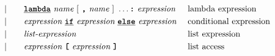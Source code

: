 \begin{alignat*}{9}
&&                       && |   &\quad &&   \textbf{\texttt{\underline{lambda}}} \ 
                                            \textit{name} \ 
                                                   [\ \textbf{\texttt{,}} \ \textit{name}\ ]\ \ldots
                                            \texttt{\textbf{:}}\ \textit{expression}
                                                           && \textrm{lambda expression}\\
&&                       && |   &\quad &&   \textit{expression} \ 
                                            \textbf{\texttt{\underline{if}}} \ \textit{expression} \ 
                                            \textbf{\texttt{\underline{else}}} \ \textit{expression} \ 
                                                           && \textrm{conditional expression}\\
&&                       && |   &\quad &&   \textit{list-expression} && \textrm{list expression} \\
&&                       && |   &\quad &&   \textit{expression} \ 
                                            \textbf{\texttt{[}}\ \textit{expression}\
                                            \textbf{\texttt{]}} && \textrm{list access}\\

\end{alignat*}
